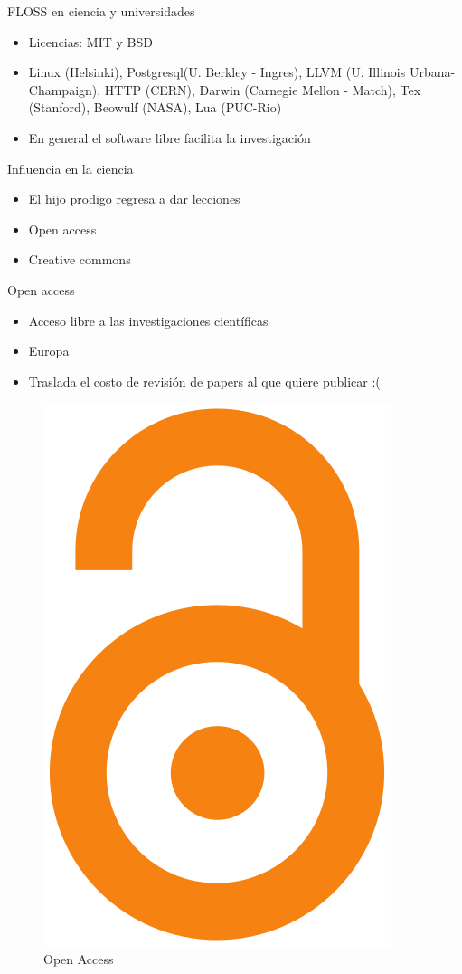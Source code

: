 \documentclass{beamer}
\begin{document}
\begin{frame}{FLOSS en ciencia y universidades}
\begin{itemize}
\item Licencias: MIT y BSD
\item Linux (Helsinki), Postgresql(U. Berkley - Ingres), LLVM (U. Illinois Urbana-Champaign), HTTP (CERN), Darwin (Carnegie Mellon - Match), Tex (Stanford), Beowulf (NASA), Lua (PUC-Rio)
\item En general el software libre facilita la investigación
\end{itemize}
\end{frame}

\begin{frame}{Influencia en la ciencia}
\begin{itemize}
\item El hijo prodigo regresa a dar lecciones
\item Open access
\item Creative commons
\end{itemize}
\end{frame}

\begin{frame}{Open access}
\begin{itemize}
\item Acceso libre a las investigaciones científicas
\item Europa
\item Traslada el costo de revisión de papers al que quiere publicar :(
\end{itemize}
\begin{figure}[tbph]
\centering
\includegraphics[width=0.25\linewidth]{Figures/Open_Access_logo.png}
\caption{Open Access}
\label{fig:open}
\end{figure}
\end{frame}
\end{document}

